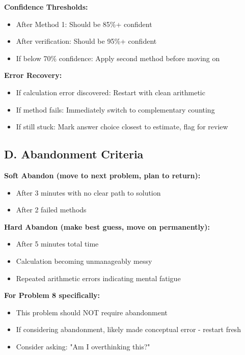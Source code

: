 \documentclass[11pt]{article}
\begin{document}
\begin{competitionbox}
\textbf{Confidence Thresholds:}
\begin{itemize}
    \item After Method 1: Should be 85\%+ confident
    \item After verification: Should be 95\%+ confident
    \item If below 70\% confidence: Apply second method before moving on
\end{itemize}

\textbf{Error Recovery:}
\begin{itemize}
    \item If calculation error discovered: Restart with clean arithmetic
    \item If method fails: Immediately switch to complementary counting
    \item If still stuck: Mark answer choice closest to estimate, flag for review
\end{itemize}

\subsection*{D. Abandonment Criteria}

\textbf{Soft Abandon (move to next problem, plan to return):}
\begin{itemize}
    \item After 3 minutes with no clear path to solution
    \item After 2 failed methods
\end{itemize}

\textbf{Hard Abandon (make best guess, move on permanently):}
\begin{itemize}
    \item After 5 minutes total time
    \item Calculation becoming unmanageably messy
    \item Repeated arithmetic errors indicating mental fatigue
\end{itemize}

\textbf{For Problem 8 specifically:}
\begin{itemize}
    \item This problem should NOT require abandonment
    \item If considering abandonment, likely made conceptual error - restart fresh
    \item Consider asking: "Am I overthinking this?"
\end{itemize}
\end{competitionbox}
\end{document}

